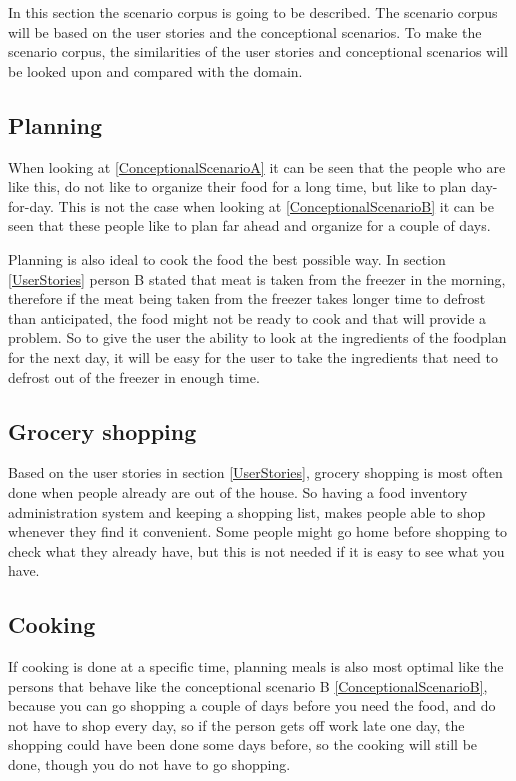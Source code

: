 
In this section the scenario corpus is going to be described. The scenario corpus will be based on the user stories and the conceptional scenarios. To make the scenario corpus, the similarities of the user stories and conceptional scenarios will be looked upon and compared with the domain.

\subsection{Planning}

When looking at \ref{ConceptionalScenarioA} it can be seen that the people who are like this, do not like to organize their food for a long time, but like to plan day-for-day. This is not the case when looking at \ref{ConceptionalScenarioB} it can be seen that these people like to plan far ahead and organize for a couple of days.

Planning is also ideal to cook the food the best possible way. In section \ref{UserStories} person B stated that meat is taken from the freezer in the morning, therefore if the meat being taken from the freezer takes longer time to defrost than anticipated, the food might not be ready to cook and that will provide a problem. So to give the user the ability to look at the ingredients of the foodplan for the next day, it will be easy for the user to take the ingredients that need to defrost out of the freezer in enough time. 

\subsection{Grocery shopping}

Based on the user stories in section \ref{UserStories}, grocery shopping is most often done when people already are out of the house. So having a food inventory administration system and keeping a shopping list, makes people able to shop whenever they find it convenient. Some people might go home before shopping to check what they already have, but this is not needed if it is easy to see what you have.

\subsection{Cooking}

If cooking is done at a specific time, planning meals is also most optimal like the persons that behave like the conceptional scenario B \ref{ConceptionalScenarioB}, because you can go shopping a couple of days before you need the food, and do not have to shop every day, so if the person gets off work late one day, the shopping could have been done some days before, so the cooking will still be done, though you do not have to go shopping.

